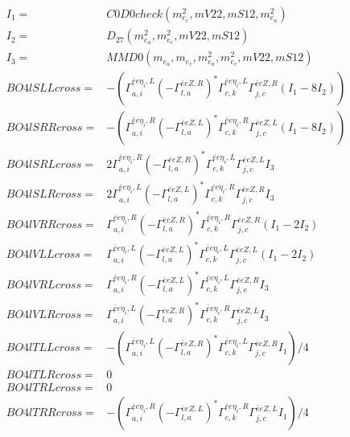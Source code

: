 \documentclass[A4,landscape]{article}
\begin{document}
\begin{align} 
I_1 = & C0D0check(m^2_{e_{{c}}}, mV22, mS12, m^2_{e_{{a}}}) \\ 
I_2 = & D_{27}(m^2_{e_{{a}}}, m^2_{e_{{c}}}, mV22, mS12) \\ 
I_3 = & MMD0(m_{e_{{a}}}, m_{e_{{c}}}, m^2_{e_{{a}}}, m^2_{e_{{c}}}, mV22, mS12) \\ 
  BO4lSLLcross= & -( \Gamma^{\bar{e}e \eta_i ,L}_{a, i} (- \Gamma^{\bar{e}e Z ,R} _{l, a})^* \Gamma^{\bar{e}e \eta_i ,L}_{c, k} \Gamma^{\bar{e}e Z ,R}_{j, c} (I_1 - 8 I_2)) \\ 
  BO4lSRRcross= & -( \Gamma^{\bar{e}e \eta_i ,R}_{a, i} (- \Gamma^{\bar{e}e Z ,L} _{l, a})^* \Gamma^{\bar{e}e \eta_i ,R}_{c, k} \Gamma^{\bar{e}e Z ,L}_{j, c} (I_1 - 8 I_2)) \\ 
  BO4lSRLcross= & 2  \Gamma^{\bar{e}e \eta_i ,R}_{a, i} (- \Gamma^{\bar{e}e Z ,R} _{l, a})^* \Gamma^{\bar{e}e \eta_i ,L}_{c, k} \Gamma^{\bar{e}e Z ,L}_{j, c} I_3 \\ 
  BO4lSLRcross= & 2  \Gamma^{\bar{e}e \eta_i ,L}_{a, i} (- \Gamma^{\bar{e}e Z ,L} _{l, a})^* \Gamma^{\bar{e}e \eta_i ,R}_{c, k} \Gamma^{\bar{e}e Z ,R}_{j, c} I_3 \\ 
  BO4lVRRcross= &  \Gamma^{\bar{e}e \eta_i ,R}_{a, i} (- \Gamma^{\bar{e}e Z ,R} _{l, a})^* \Gamma^{\bar{e}e \eta_i ,R}_{c, k} \Gamma^{\bar{e}e Z ,R}_{j, c} (I_1 - 2 I_2) \\ 
  BO4lVLLcross= &  \Gamma^{\bar{e}e \eta_i ,L}_{a, i} (- \Gamma^{\bar{e}e Z ,L} _{l, a})^* \Gamma^{\bar{e}e \eta_i ,L}_{c, k} \Gamma^{\bar{e}e Z ,L}_{j, c} (I_1 - 2 I_2) \\ 
  BO4lVRLcross= &  \Gamma^{\bar{e}e \eta_i ,R}_{a, i} (- \Gamma^{\bar{e}e Z ,L} _{l, a})^* \Gamma^{\bar{e}e \eta_i ,L}_{c, k} \Gamma^{\bar{e}e Z ,R}_{j, c} I_3 \\ 
  BO4lVLRcross= &  \Gamma^{\bar{e}e \eta_i ,L}_{a, i} (- \Gamma^{\bar{e}e Z ,R} _{l, a})^* \Gamma^{\bar{e}e \eta_i ,R}_{c, k} \Gamma^{\bar{e}e Z ,L}_{j, c} I_3 \\ 
  BO4lTLLcross= & -( \Gamma^{\bar{e}e \eta_i ,L}_{a, i} (- \Gamma^{\bar{e}e Z ,R} _{l, a})^* \Gamma^{\bar{e}e \eta_i ,L}_{c, k} \Gamma^{\bar{e}e Z ,R}_{j, c} I_1)/4 \\ 
  BO4lTLRcross= & 0 \\ 
  BO4lTRLcross= & 0 \\ 
  BO4lTRRcross= & -( \Gamma^{\bar{e}e \eta_i ,R}_{a, i} (- \Gamma^{\bar{e}e Z ,L} _{l, a})^* \Gamma^{\bar{e}e \eta_i ,R}_{c, k} \Gamma^{\bar{e}e Z ,L}_{j, c} I_1)/4 \\ 
\end{align} 
\end{document}

